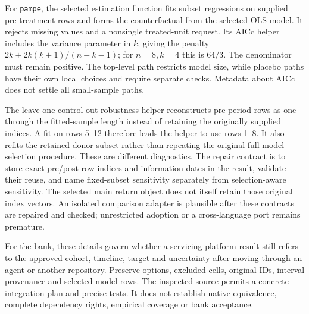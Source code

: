 For \texttt{pampe}, the selected estimation function fits subset regressions on supplied pre-treatment rows and forms the
counterfactual from the selected OLS model. It rejects missing values and a nonsingle treated-unit request. Its AICc helper
includes the variance parameter in $k$, giving the penalty $2k+2k(k+1)/(n-k-1)$; for $n=8,k=4$ this is $64/3$.
The denominator must remain positive. The top-level path restricts model size, while placebo paths have their own local
choices and require separate checks. Metadata about AICc does not settle all small-sample paths.~\citep{exec28_panel_delegates,exec28_panel_delegate_reference}

The leave-one-control-out robustness helper reconstructs pre-period rows as one through the fitted-sample length instead
of retaining the originally supplied indices. A fit on rows 5--12 therefore leads the helper to use rows 1--8. It also refits
the retained donor subset rather than repeating the original full model-selection procedure. These are different
diagnostics. The repair contract is to store exact pre/post row indices and information dates in the result, validate
their reuse, and name fixed-subset sensitivity separately from selection-aware sensitivity. The selected main return
object does not itself retain those original index vectors. An isolated comparison adapter is plausible after these
contracts are repaired and checked; unrestricted adoption or a cross-language port remains premature.
\citep{exec28_panel_delegates,exec28_panel_delegate_reference}

For the bank, these details govern whether a servicing-platform result still refers to the approved cohort, timeline,
target and uncertainty after moving through an agent or another repository. Preserve options, excluded cells, original
IDs, interval provenance and selected model rows. The inspected source permits a concrete integration plan and precise
tests. It does not establish native equivalence, complete dependency rights, empirical coverage or bank acceptance.
